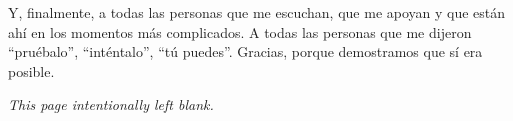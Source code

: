 Y, finalmente, a todas las personas que me escuchan, que me apoyan y que están
ahí en los momentos más complicados. A todas las personas que me dijeron
``pruébalo'', ``inténtalo'', ``tú puedes''. Gracias, porque demostramos
que sí era posible.

\par
\endgroup

\clearpage
\thispagestyle{empty}
\null\vfill
\begin{center}
  \textit{This page intentionally left blank.}
\end{center}
\vfill\null
